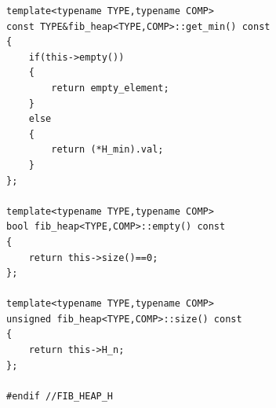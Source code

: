 \documentclass{article}
\begin{document}
\begin{spacing}{2.0}
\begin{lstlisting}
template<typename TYPE,typename COMP>
const TYPE&fib_heap<TYPE,COMP>::get_min() const
{
    if(this->empty())
    {
        return empty_element;
    }
    else
    {
        return (*H_min).val;
    }
};

template<typename TYPE,typename COMP>
bool fib_heap<TYPE,COMP>::empty() const
{
    return this->size()==0;
};

template<typename TYPE,typename COMP>
unsigned fib_heap<TYPE,COMP>::size() const
{
    return this->H_n;
};

#endif //FIB_HEAP_H

\end{lstlisting}
\end{spacing}
\end{document}
